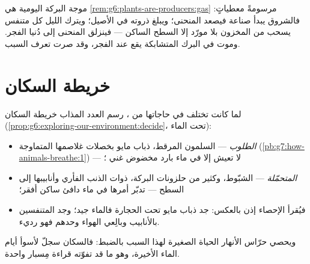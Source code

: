 \begin{example}\label{ex:g7:oxygen-in-the-water:curve}
موجة البركة اليومية هي
\cref{rem:g6:plants-are-producers:gas} مرسومةً معطياتٍ: فالشروق
يبدأ صناعة  فيصعد المنحنى؛ ويبلغ ذروته في الأصيل؛ ويترك
الليل كل متنفس يسحب من المخزون بلا مورّد إلا السطح الساكن ---
فينزلق المنحنى إلى دُنيا الفجر. وموت  في البرك المتشابكة
يقع عند الفجر، وقد صرت تعرف السبب.
\end{example}

\section{خريطة السكان}

\begin{proposition}\label{prop:g7:oxygen-in-the-water:map}
لما كانت  تختلف في حاجاتها من ، رسم العدد المذاب
خريطة السكان
(\cref{prop:g6:exploring-our-environment:decide}، تحت الماء):
\begin{itemize}
  \item {} \emph{الطلوب} --- السلمون المرقط،  ذباب
        مايو بخصلات غلاصمها المتماوجة
        (\cref{pb:g7:how-animals-breathe:1}) --- لا تعيش إلا في
        ماء بارد مخضوض غني ؛
  \item {} \emph{المتحمّلة} --- الشبّوط، وكثير من حلزونات
        البركة،  ذوات الذنب الفأري وأنابيبها إلى السطح
        --- تدبّر أمرها في ماء دافئ ساكن أفقر؛
  \item فيُقرأ الإحصاء إذن بالعكس: جد  ذباب مايو تحت الحجارة
        فالماء جيد؛ وجد المتنفسين بالأنابيب وبالِعي الهواء وحدهم
        فهو رديء.
\end{itemize}
ويحصي حرّاس الأنهار الحياة الصغيرة لهذا السبب بالضبط: فالسكان سجلّ
لأسوأ أيام الماء الأخيرة، وهو ما قد تفوّته قراءة مِسبار واحدة.
\end{proposition}
\admitted

